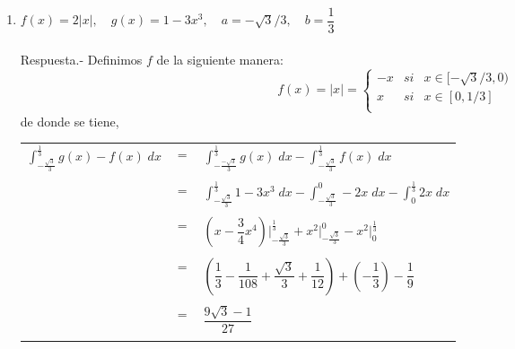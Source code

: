 \begin{enumerate}[\bfseries 1.]
\item $f(x) = 2|x|, \quad g(x) = 1-3x^3, \quad a=-\sqrt{3}/3, \quad b=\dfrac{1}{3}$\\\\ 
    Respuesta.-\; Definimos $f$ de la siguiente manera: $$f(x) = |x| = \left\{\begin{array}{rcl}
	-x&si&x\in [-\sqrt{3}/3,0)\\
	    x&si&x\in [0,1/3]\\
	    \end{array}\right.$$
	    de donde se tiene,
	    \begin{center}
		\begin{tabular}{rcl}
		    $\displaystyle\int_{-\frac{\sqrt{3}}{3}}^{\frac{1}{3}} g(x)-f(x)\; dx$ & $=$ & $\displaystyle\int_{-\frac{-\sqrt{3}}{3}}^{\frac{1}{3}}g(x) \; dx - \int_{-\frac{\sqrt{3}}{3}}^{\frac{1}{3}} f(x) \; dx$\\\\\
		    & $=$ & $\displaystyle\int_{-\frac{\sqrt{3}}{3}}^{\frac{1}{3}} 1-3x^3 \; dx - \int_{-\frac{\sqrt{3}}{3}}^{0} -2x \; dx - \int_{0}^{\frac{1}{3}} 2x \; dx$\\\\
		    & $=$ & $\left(x-\dfrac{3}{4} x^4\right)\bigg|_{-\frac{\sqrt{3}}{3}}^{\frac{1}{3}} + x^2 \bigg|_{-\frac{\sqrt{3}}{3}}^{0} - x^2 \bigg|_0^{\frac{1}{3}}$\\\\
		    & $=$ & $\left(\dfrac{1}{3} - \dfrac{1}{108} + \dfrac{\sqrt{3}}{3} + \dfrac{1}{12}\right)+\left(-\dfrac{1}{3}\right)-\dfrac{1}{9}$\\\\
		    & $=$ & $\dfrac{9\sqrt{3}-1}{27}$\\\\
		\end{tabular}
	    \end{center}



\end{enumerate}
